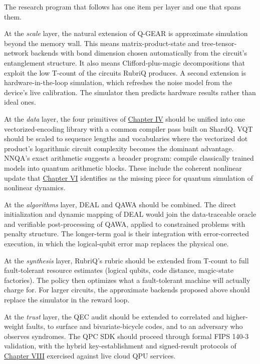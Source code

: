 \documentclass{report}
\theoremstyle{plain}
\theoremstyle{definition}
\theoremstyle{remark}
\begin{document}
The research program that follows has one item per layer and one that spans them.

At the \emph{scale} layer, the natural extension of Q-GEAR is approximate simulation beyond the memory wall. This means matrix-product-state and tree-tensor-network backends with bond dimension chosen automatically from the circuit's entanglement structure. It also means Clifford-plus-magic decompositions that exploit the low T-count of the circuits RubriQ produces. A second extension is hardware-in-the-loop simulation, which refreshes the noise model from the device's live calibration. The simulator then predicts hardware results rather than ideal ones.

At the \emph{data} layer, the four primitives of \hyperref[ch:qml]{Chapter IV} should be unified into one vectorized-encoding library with a common compiler pass built on ShardQ. VQT should be scaled to sequence lengths and vocabularies where the vectorized dot product's logarithmic circuit complexity becomes the dominant advantage. NNQA's exact arithmetic suggests a broader program: compile classically trained models into quantum arithmetic blocks. These include the coherent nonlinear update that \hyperref[ch:synthesis]{Chapter VI} identifies as the missing piece for quantum simulation of nonlinear dynamics.

At the \emph{algorithms} layer, DEAL and QAWA should be combined. The direct initialization and dynamic mapping of DEAL would join the data-traceable oracle and verifiable post-processing of QAWA, applied to constrained problems with penalty structure. The longer-term goal is their integration with error-corrected execution, in which the logical-qubit error map replaces the physical one.

At the \emph{synthesis} layer, RubriQ's rubric should be extended from T-count to full fault-tolerant resource estimates (logical qubits, code distance, magic-state factories). The policy then optimizes what a fault-tolerant machine will actually charge for. For larger circuits, the approximate backends proposed above should replace the simulator in the reward loop.

At the \emph{trust} layer, the QEC audit should be extended to correlated and higher-weight faults, to surface and bivariate-bicycle codes, and to an adversary who observes syndromes. The QPC SDK should proceed through formal FIPS 140-3 validation, with the hybrid key-establishment and signed-result protocols of \hyperref[ch:pqc]{Chapter VIII} exercised against live cloud QPU services.
\end{document}
